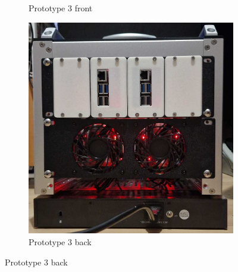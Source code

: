 \begin{frame}
\begin{figure}
\begin{subfigure}[b]{0.24\textwidth}
			\caption{Prototype 3 front}
			\label{fig:2.c}
		\end{subfigure}
		\hfill
		\begin{subfigure}[b]{0.24\textwidth}
			\centering
			\includegraphics[width=\textwidth]{graphics/mini-HPC-proto3_back.png}
			\caption{Prototype 3 back}
			\label{fig:2.d}
		\end{subfigure}

		\label{fig:2}
	\end{figure}
	
\end{frame}
